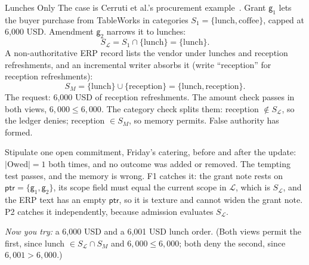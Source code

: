 \begin{pdexample}{Lunches Only}
\setlength{\parskip}{4pt plus 1pt}
\label{ex:stp-lunches-only}
The case is Cerruti et al.'s procurement example~. Grant
$\mathsf{g}_1$ lets the buyer purchase from TableWorks in categories
$S_1=\{\text{lunch},\text{coffee}\}$, capped at 6{,}000 USD. Amendment $\mathsf{g}_2$
narrows it to lunches:
\[
S_{\mathcal{L}}=S_1\cap\{\text{lunch}\}=\{\text{lunch}\}.
\]
A non-authoritative ERP record lists the vendor under lunches and reception
refreshments, and an incremental writer absorbs it (write ``reception'' for
reception refreshments):
\[
S_M=\{\text{lunch}\}\cup\{\text{reception}\}=\{\text{lunch},\text{reception}\}.
\]
The request: 6{,}000 USD of reception refreshments. The amount check passes in
both views, $6{,}000\le 6{,}000$. The category check splits them:
reception $\notin S_{\mathcal{L}}$, so the ledger denies; reception $\in S_M$, so memory
permits. False authority has formed.

Stipulate one open commitment, Friday's catering, before and after the update:
$|\mathrm{Owed}|=1$ both times, and no outcome was added or removed. The
tempting test passes, and the memory is wrong. F1 catches it: the grant note
rests on $\mathsf{ptr}=\{\mathsf{g}_1,\mathsf{g}_2\}$, its scope field must equal the current
scope in $\mathcal{L}$, which is $S_{\mathcal{L}}$, and the ERP text has an empty $\mathsf{ptr}$, so it
is texture and cannot widen the grant note. P2 catches
it independently, because admission evaluates $S_{\mathcal{L}}$.

\emph{Now you try:} a 6{,}000 USD and a 6{,}001 USD lunch order. (Both views
permit the first, since lunch $\in S_{\mathcal{L}}\cap S_M$ and $6{,}000\le 6{,}000$; both
deny the second, since $6{,}001>6{,}000$.)
\end{pdexample}


